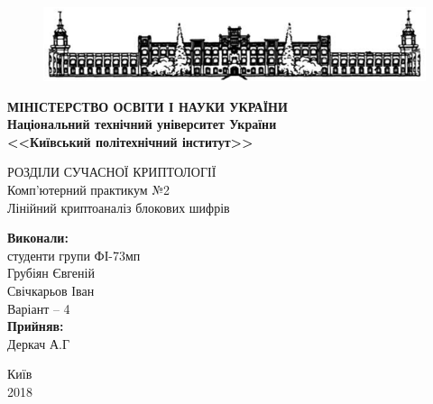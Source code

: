 \documentclass[12pt,a4paper]{article}
\begin{document}
\begin{titlepage}
  \begin{center}

\begin{figure}
  \centering
    \includegraphics{shapkaKPI}
\end{figure}

 \Large \textbf{МІНІСТЕРСТВО ОСВІТИ І НАУКИ УКРАЇНИ}\\
      \textbf{ Національний технічний університет України\\
      <<Київський політехнічний інститут>>}\\

       \vspace{2 cm}
    
РОЗДІЛИ СУЧАСНОЇ КРИПТОЛОГІЇ\\
Комп’ютерний практикум №2\\
\vspace{1 cm}
Лінійний криптоаналіз блокових шифрів \\
    \vfill
    \vfill
  
\newlength{\ML}
\hfill\begin{minipage}{0.4\textwidth}
 \textbf{Виконали:}\\
 студенти групи ФІ-73мп\\
 Грубіян Євгеній\\
 Свічкарьов Іван\\
 Варіант -- 4 \\
 \textbf{Прийняв:}\\
 Деркач А.Г\\
\end{minipage}%
\vfill
\vfill  
 

  
\begin{center}
  Київ\\
  2018
\end{center}
\end{center}
\end{titlepage}

\setcounter{page}{2} %
\end{document}
